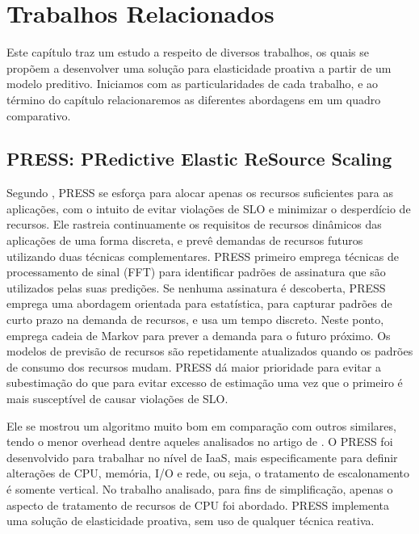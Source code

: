 \documentclass[twoside,english,brazilian]{UNISINOSmonografia}
\begin{document}
\chapter{Trabalhos Relacionados}
Este capítulo traz um estudo a respeito de diversos trabalhos, os quais se propõem a desenvolver uma solução para elasticidade proativa a partir de um modelo preditivo. Iniciamos com as particularidades de cada trabalho, e ao término do capítulo relacionaremos as diferentes abordagens em um quadro comparativo.

\section{PRESS: PRedictive Elastic ReSource Scaling}

Segundo \citep{Wilkes2010}, PRESS se esforça para alocar apenas os recursos suficientes para as aplicações, com o intuito de evitar violações de SLO e minimizar o desperdício de recursos. Ele rastreia continuamente os requisitos de recursos dinâmicos das aplicações de uma forma discreta, e prevê demandas de recursos futuros utilizando duas técnicas complementares. PRESS primeiro emprega técnicas de processamento de sinal (FFT) para identificar padrões de assinatura que são utilizados pelas suas predições. Se nenhuma assinatura é descoberta, PRESS emprega uma abordagem orientada para estatística, para capturar padrões de curto prazo na demanda de recursos, e usa um tempo discreto. Neste ponto, emprega cadeia de Markov para prever a demanda para o futuro próximo. Os modelos de previsão de recursos são repetidamente atualizados quando os padrões de consumo dos recursos mudam. PRESS dá maior prioridade para evitar a subestimação do que para evitar excesso de estimação uma vez que o primeiro é mais susceptível de causar violações de SLO.

Ele se mostrou um algoritmo muito bom em comparação com outros similares, tendo o menor overhead dentre aqueles analisados no artigo de \cite{Wilkes2010}. O PRESS foi desenvolvido para trabalhar no nível de IaaS, mais especificamente para definir alterações de CPU, memória, I/O e rede, ou seja, o tratamento de escalonamento é somente vertical. No trabalho analisado, para fins de simplificação, apenas o aspecto de tratamento de recursos de CPU foi abordado. PRESS implementa uma solução de elasticidade proativa, sem uso de qualquer técnica reativa.
\end{document}
